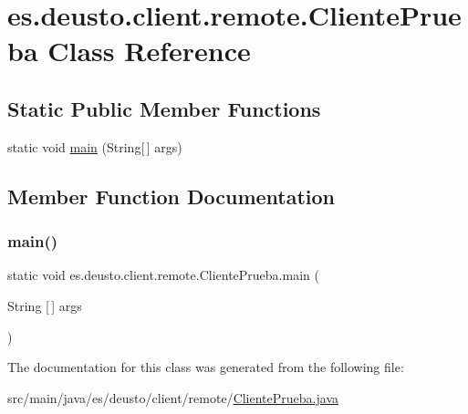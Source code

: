 \hypertarget{classes_1_1deusto_1_1client_1_1remote_1_1_cliente_prueba}{}\section{es.\+deusto.\+client.\+remote.\+Cliente\+Prueba Class Reference}
\label{classes_1_1deusto_1_1client_1_1remote_1_1_cliente_prueba}
\subsection*{Static Public Member Functions}
\begin{DoxyCompactItemize}
\item 
static void \mbox{\hyperlink{classes_1_1deusto_1_1client_1_1remote_1_1_cliente_prueba_a552e35302888ee784a0f99653ade4484}{main}} (String\mbox{[}$\,$\mbox{]} args)
\end{DoxyCompactItemize}


\subsection{Member Function Documentation}
\mbox{\label{classes_1_1deusto_1_1client_1_1remote_1_1_cliente_prueba_a552e35302888ee784a0f99653ade4484}} 
\subsubsection{\texorpdfstring{main()}{main()}}
{\footnotesize\ttfamily static void es.\+deusto.\+client.\+remote.\+Cliente\+Prueba.\+main (\begin{DoxyParamCaption}\item[{String \mbox{[}$\,$\mbox{]}}]{args }\end{DoxyParamCaption})\hspace{0.3cm}{\ttfamily [static]}}



The documentation for this class was generated from the following file\+:\begin{DoxyCompactItemize}
\item 
src/main/java/es/deusto/client/remote/\mbox{\hyperlink{_cliente_prueba_8java}{Cliente\+Prueba.\+java}}\end{DoxyCompactItemize}
